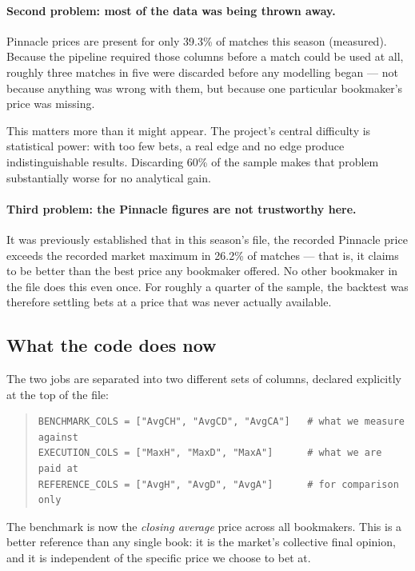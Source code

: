 \documentclass[11pt,a4paper]{article}
\begin{document}
\paragraph{Second problem: most of the data was being thrown away.}
Pinnacle prices are present for only 39.3\% of matches this season
(measured). Because the pipeline required those columns before a match could
be used at all, roughly three matches in five were discarded before any
modelling began --- not because anything was wrong with them, but because one
particular bookmaker's price was missing.

This matters more than it might appear. The project's central difficulty is
statistical power: with too few bets, a real edge and no edge produce
indistinguishable results. Discarding 60\% of the sample makes that problem
substantially worse for no analytical gain.

\paragraph{Third problem: the Pinnacle figures are not trustworthy here.}
It was previously established that in this season's file, the recorded
Pinnacle price exceeds the recorded market maximum in 26.2\% of matches ---
that is, it claims to be better than the best price any bookmaker offered.
No other bookmaker in the file does this even once. For roughly a quarter of
the sample, the backtest was therefore settling bets at a price that was
never actually available.

\subsection{What the code does now}

The two jobs are separated into two different sets of columns, declared
explicitly at the top of the file:

\begin{quote}\small
\begin{verbatim}
BENCHMARK_COLS = ["AvgCH", "AvgCD", "AvgCA"]   # what we measure against
EXECUTION_COLS = ["MaxH", "MaxD", "MaxA"]      # what we are paid at
REFERENCE_COLS = ["AvgH", "AvgD", "AvgA"]      # for comparison only
\end{verbatim}
\end{quote}

The benchmark is now the \emph{closing average} price across all bookmakers.
This is a better reference than any single book: it is the market's
collective final opinion, and it is independent of the specific price we
choose to bet at.
\end{document}
